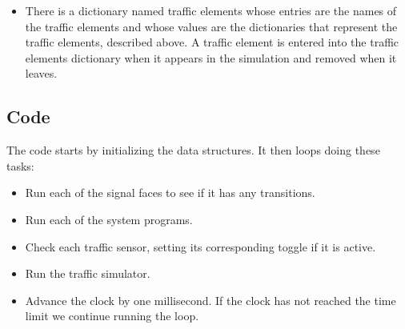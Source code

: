 \documentclass[letterpaper,twoside]{article}
\begin{document}
\begin{itemize}
\begin{itemize}
{  it is unconstrained.}
\item{Current speed is the speed the traffic elememt is actually moving towards
  its next milestone.  This will be the desired speed unless something
  limits its speed:}
  \begin{itemize}
  \item{The speed limit of the road.  Lanes 1, 2, B, C, 4, 5, F, and G are
    limited to 45 miles per hour.  Lanes A, 3, D, E, 6, H, and J are limited
    to 25 miles per hour.  Pedestrian crossings are limited to walking speed.}
  \item{If there is a vehicle just ahead of this one, this vehicle
    is limited to the speed of that vehicle.}
  \item{If this traffic element is 0 distance from the intersection on lanes
    A, ps, B, C, D, E, pn, F, G, H, or J and the corresponding signal face
    is red, the speed of this traffic element is 0.}
  \end{itemize}
\end{itemize}

\item{There is a dictionary named traffic elements whose entries
are the names of the traffic elements and whose values are the dictionaries
that represent the traffic elements, described above.
A traffic element is entered into the traffic elements dictionary
when it appears in the simulation and removed when it leaves.}
\end{itemize}

\subsection{Code}

The code starts by initializing the data structures.  It then loops
doing these tasks:

\begin{itemize}

\item{Run each of the signal faces to see if it has any transitions.}
  
\item{Run each of the system programs.}

\item{Check each traffic sensor, setting its corresponding toggle if
  it is active.}

\item{Run the traffic simulator.}

\item{Advance the clock by one millisecond.  If the clock has not reached
  the time limit we continue running the loop.}
  
\end{itemize}
\end{document}
